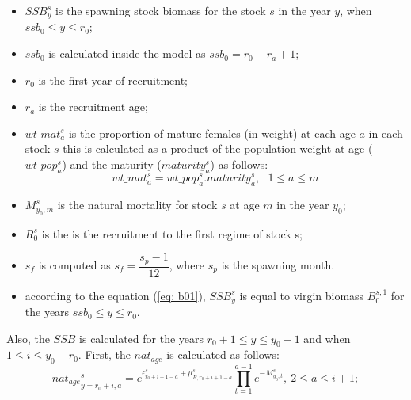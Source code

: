 \documentclass{article}
\begin{document}
\begin{itemize}
  
   \item $SSB^s_y$ is the spawning stock biomass for the stock $s$ in the year $y$, when  $ssb_0\leq y \leq r_0$;

   \item $ssb_0$ is calculated inside the model as $ssb_0 = r_0 - r_a + 1$;
   
   \item $r_0$ is the first year of recruitment;

   \item $r_a$ is the recruitment age;
   
   \item $wt\_{mat}^s_a$ is the proportion of mature females (in weight) at each age $a$ in each stock $s$ this is calculated as a product of the population weight at age ($wt\_pop^s_a$) and the maturity ($maturity^s_a$) as follows:
    \begin{equation}
        wt\_{mat}^s_a=wt\_pop^s_a .maturity^s_a, \ \ \ 1\leq a \leq m 
    \end{equation}
        
    \item $M^s_{y_0,m}$ is the natural mortality for stock $s$ at age $m$ in the year $y_0$;
    
    \item $R^s_{0}$ is the is the recruitment to the first regime of stock s;

    \item $s_f$ is computed as $s_f=\dfrac{s_p-1}{12}$, where $s_p$ is the spawning month.
    \item according to the equation (\ref{eq: b01}), $SSB^s_y$ is equal to virgin biomass $B^{s,1}_0$ for the years $ssb_0\leq y \leq r_0$.
\end{itemize}

\hfill

Also, the $SSB$ is calculated for the years $r_0+1 \leq y \leq y_0 - 1$ and when $1\leq i \leq y_0-r_0$. First, the $nat_{age}$ is calculated as follows:\\

\begin{equation}
{nat_{age}}_{y=r_0+i,a}^s= e^{\epsilon^s_{r_0+i+1-a}+\mu^s_{R,r_0+i+1-a}}\prod_{t=1}^{a-1}e^{-M^s_{y_0,t}}, %
\ 2\leq a \leq i+1;
\end{equation}
\end{document}
